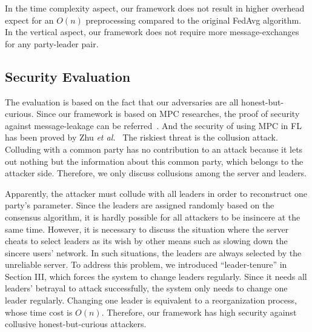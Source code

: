 In the time complexity aspect, our framework does not result in higher overhead expect for an $O(n)$ preprocessing compared to the original FedAvg algorithm. In the vertical aspect, our framework does not require more message-exchanges for any party-leader pair. 

\subsection{Security Evaluation}
The evaluation is based on the fact that our adversaries are all honest-but-curious. Since our framework is based on MPC researches, the proof of security against message-leakage can be referred~\cite{Shamir,Du2001SecureMC,Three-Party}. And the security of using MPC in FL has been proved by Zhu \emph{et al.}~\cite{Weighted} The riskiest threat is the collusion attack. Colluding with a common party has no contribution to an attack because it lets out nothing but the information about this common party, which belongs to the attacker side. Therefore, we only discuss collusions among the server and leaders. 

Apparently, the attacker must collude with all leaders in order to reconstruct one party's parameter. Since the leaders are assigned randomly based on the consensus algorithm, it is hardly possible for all attackers to be insincere at the same time. However, it is necessary to discuss the situation where the server cheats to select leaders as its wish by other means such as slowing down the sincere users' network. In such situations, the leaders are always selected by the unreliable server. To address this problem, we introduced ``leader-tenure'' in Section III, which forces the system to change leaders regularly. Since it needs all leaders' betrayal to attack successfully, the system only needs to change one leader regularly. Changing one leader is equivalent to a reorganization process, whose time cost is $O(n)$. Therefore, our framework has high security against collusive honest-but-curious attackers.
